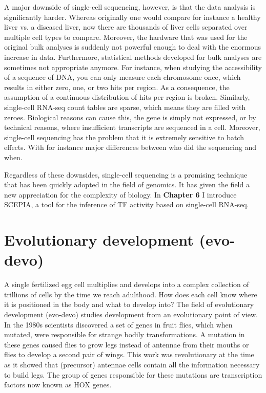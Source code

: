 A major downside of single-cell sequencing, however, is that the data analysis is significantly harder. Whereas originally one would compare for instance a healthy liver vs. a diseased liver, now there are thousands of liver cells separated over multiple cell types to compare. Moreover, the hardware that was used for the original bulk analyses is suddenly not powerful enough to deal with the enormous increase in data. Furthermore, statistical methods developed for bulk analyses are sometimes not appropriate anymore. For instance, when studying the accessibility of a sequence of DNA, you can only measure each chromosome once, which results in either zero, one, or two hits per region. As a consequence, the assumption of a continuous distribution of hits per region is broken. Similarly, single-cell RNA-seq count tables are sparse, which means they are filled with zeroes. Biological reasons can cause this, the gene is simply not expressed, or by technical reasons, where insufficient transcripts are sequenced in a cell\cite{Jiang2022}. Moreover, single-cell sequencing has the problem that it is extremely sensitive to batch effects. With for instance major differences between who did the sequencing and when.

Regardless of these downsides, single-cell sequencing is a promising technique that has been quickly adopted in the field of genomics. It has given the field a new appreciation for the complexity of biology. In \textbf{Chapter 6} I introduce SCEPIA, a tool for the inference of TF activity based on single-cell RNA-seq.

\section{Evolutionary development (evo-devo)}

A single fertilized egg cell multiplies and develops into a complex collection of trillions of cells by the time we reach adulthood. How does each cell know where it is positioned in the body and what to develop into? The field of evolutionary development (evo-devo) studies development from an evolutionary point of view. In the 1980s scientists discovered a set of genes in fruit flies, which when mutated, were responsible for strange bodily transformations. A mutation in these genes caused flies to grow legs instead of antennae from their mouths\cite{Schneuwly1987} or flies to develop a second pair of wings\cite{Weatherbee1998}. This work was revolutionary at the time as it showed that (precursor) antennae cells contain all the information necessary to build legs. The group of genes responsible for these mutations are transcription factors now known as HOX genes.

